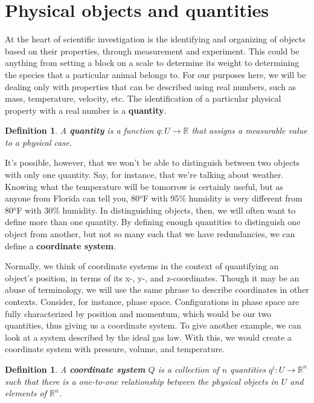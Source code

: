 \documentclass{book}
\newtheorem{defn}[equation]{Definition}
\begin{document}
\section{Physical objects and quantities}

At the heart of scientific investigation is the identifying and organizing of objects based on their properties, through measurement and experiment. This could be anything from setting a block on a scale to determine its weight to determining the species that a particular animal belongs to. For our purposes here, we will be dealing only with properties that can be described using real numbers, such as mass, temperature, velocity, etc. The identification of a particular physical property with a real number is a \textbf{quantity}.

\begin{defn}
	A \textbf{quantity} is a function $q : U \to \mathbb{R}$ that assigns a measurable value to a physical case.
\end{defn}



It's possible, however, that we won't be able to distinguish between two objects with only one quantity. Say, for instance, that we're talking about weather. Knowing what the temperature will be tomorrow is certainly useful, but as anyone from Florida can tell you, 80$^o$F with 95$\%$ humidity is very different from 80$^o$F with 30$\%$ humidity. In distinguishing objects, then, we will often want to define more than one quantity. By defining enough quantities to distinguish one object from another, but not so many such that we have redundancies, we can define a \textbf{coordinate system}.


Normally, we think of coordinate systems in the context of quantifying an object's position, in terms of its x-, y-, and z-coordinates. Though it may be an abuse of terminology, we will use the same phrase to describe coordinates in other contexts. Consider, for instance, phase space. Configurations in phase space are fully characterized by position and momentum, which would be our two quantities, thus giving us a coordinate system. To give another example, we can look at a system described by the ideal gas law. With this, we would create a coordinate system with pressure, volume, and temperature. 

\begin{defn}
	A \textbf{coordinate system} $Q$ is a collection of $n$ quantities $q^i : U \to \mathbb{R}^n$ such that there is a one-to-one relationship between the physical objects in $U$ and elements of $\mathbb{R}^n$.
\end{defn}
\end{document}
